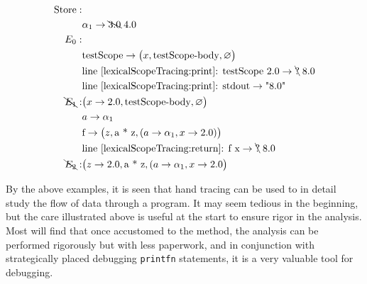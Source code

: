 \begin{align*}
  \text{Store}: &\\
  & \alpha_1 \rightarrow \bcancel{3.0}\; 4.0\\
  E_0:&\\
      &\text{testScope} \rightarrow \big(x, \text{testScope-body}, \varnothing\big)\\
      & \text{line~\ref{lexicalScopeTracing:print}: testScope 2.0} \rightarrow \bcancel{\text{?}}\; 8.0\\
      & \text{line~\ref{lexicalScopeTracing:print}: stdout} \rightarrow \text{"8.0"}\\
  \bcancel{E_1}: & \big(x\rightarrow 2.0, \text{testScope-body}, \varnothing\big)\\
      & a \rightarrow \alpha_1\\
      & \text{f} \rightarrow \big(z, \text{a * z}, (a \rightarrow \alpha_1, x\rightarrow 2.0)\big)\\
      & \text{line~\ref{lexicalScopeTracing:return}: f x} \rightarrow \bcancel{\text{?}}\; 8.0\\
  \bcancel{E_2}: & \big(z \rightarrow 2.0, \text{a * z}, (a \rightarrow \alpha_1, x\rightarrow 2.0\big)\\
\end{align*}

By the above examples, it is seen that hand tracing can be used to in detail study the flow of data through a program. It may seem tedious in the beginning, but the care illustrated above is useful at the start to ensure rigor in the analysis. Most will find that once accustomed to the method, the analysis can be performed rigorously but with less paperwork, and in conjunction with strategically placed debugging \lstinline!printfn! statements, it is a very valuable tool for debugging.

